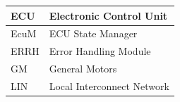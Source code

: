 \begin{longtable}{|l|l|}
\begin{minipage}{0.31\linewidth}\raggedright\vspace{.75ex}ECU\vspace{.75ex}\end{minipage} & \begin{minipage}{0.63\linewidth}\raggedright\vspace{.75ex}Electronic Control Unit\vspace{.75ex}\end{minipage}\\\hline
\begin{minipage}{0.31\linewidth}\raggedright\vspace{.75ex}EcuM\vspace{.75ex}\end{minipage} & \begin{minipage}{0.63\linewidth}\raggedright\vspace{.75ex}ECU State Manager\vspace{.75ex}\end{minipage}\\\hline
\begin{minipage}{0.31\linewidth}\raggedright\vspace{.75ex}ERRH\vspace{.75ex}\end{minipage} & \begin{minipage}{0.63\linewidth}\raggedright\vspace{.75ex}Error Handling Module\vspace{.75ex}\end{minipage}\\\hline
\begin{minipage}{0.31\linewidth}\raggedright\vspace{.75ex}GM\vspace{.75ex}\end{minipage} & \begin{minipage}{0.63\linewidth}\raggedright\vspace{.75ex}General Motors\vspace{.75ex}\end{minipage}\\\hline
\begin{minipage}{0.31\linewidth}\raggedright\vspace{.75ex}LIN\vspace{.75ex}\end{minipage} & \begin{minipage}{0.63\linewidth}\raggedright\vspace{.75ex}Local Interconnect Network\vspace{.75ex}\end{minipage}\\\hline

\end{longtable}
